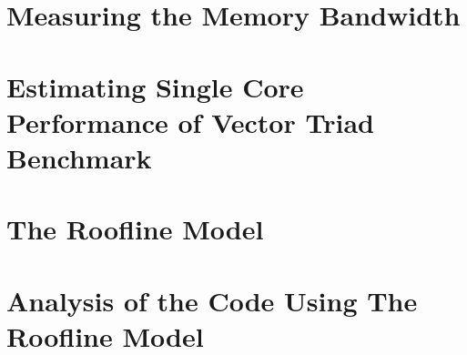 \documentclass[unicode,11pt,a4paper,oneside,numbers=endperiod,openany]{scrartcl}
\begin{document}
\setassignment
{}

\newline



\section{Measuring the Memory Bandwidth  }

\section{Estimating Single Core Performance of Vector Triad Benchmark }

\section{The Roofline Model}

\section{Analysis of the Code Using The Roofline Model }
\end{document}
